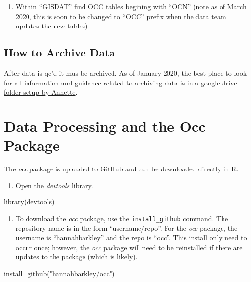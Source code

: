 \documentclass[
]{book}
\newenvironment{Shaded}{\begin{snugshade}}{\end{snugshade}}
\newcommand{\FunctionTok}[1]{\textcolor[rgb]{0.00,0.00,0.00}{#1}}
\newcommand{\NormalTok}[1]{#1}
\newcommand{\StringTok}[1]{\textcolor[rgb]{0.31,0.60,0.02}{#1}}
\providecommand{\tightlist}{%
  \setlength{\itemsep}{0pt}\setlength{\parskip}{0pt}}
\begin{document}
\begin{enumerate}
\item
  Within ``GISDAT'' find OCC tables begining with ``OCN'' (note as of March 2020, this is soon to be changed to ``OCC'' prefix when the data team updates the new tables)
\end{enumerate}

\hypertarget{how-to-archive-data}{%
\section{How to Archive Data}\label{how-to-archive-data}}

After data is qc'd it mus be archived. As of January 2020, the best place to look for all information and guidance related to archiving data is in a \href{https://drive.google.com/drive/folders/1Oq76hN6eOhhJOevwZiO0nX4Gtf0tiJrp}{google drive folder setup by Annette}.

\hypertarget{data_processing}{%
\chapter{Data Processing and the Occ Package}\label{data_processing}}

The \emph{occ} package is uploaded to GitHub and can be downloaded directly in R.

\begin{enumerate}
\def\labelenumi{\arabic{enumi}.}
\tightlist
\item
  Open the \emph{devtools} library.
\end{enumerate}

\begin{Shaded}
\begin{Highlighting}[]
\FunctionTok{library}\NormalTok{(devtools)}
\end{Highlighting}
\end{Shaded}

\begin{enumerate}
\def\labelenumi{\arabic{enumi}.}
\setcounter{enumi}{1}
\tightlist
\item
  To download the \emph{occ} package, use the \texttt{install\_github} command. The repository name is in the form ``username/repo''. For the \emph{occ} package, the username is ``hannahbarkley'' and the repo is ``occ''. This install only need to occur once; however, the \emph{occ} package will need to be reinstalled if there are updates to the package (which is likely).
\end{enumerate}

\begin{Shaded}
\begin{Highlighting}[]
\FunctionTok{install\_github}\NormalTok{(}\StringTok{"hannahbarkley/occ"}\NormalTok{)}
\end{Highlighting}
\end{Shaded}
\end{document}
